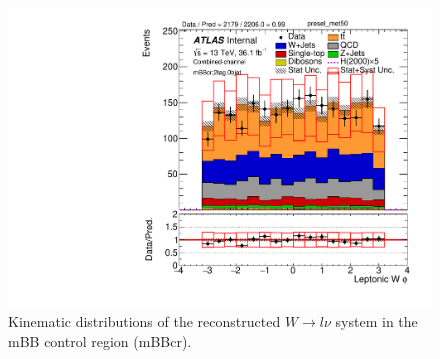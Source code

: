 \begin{figure}[!h]
\begin{center}
\includegraphics[scale=0.33]{./figures/boosted/PlotsInMbbCR/DataMC_2tag_0bjet_mbbcr_lepton_presel_met50_WlepPhi}
\caption{Kinematic distributions of the reconstructed $W \to l\nu$ system in the mBB control region (mBBcr).}
\label{fig:boosted_mbbcr_wlep}
\end{center}
\end{figure}
 
